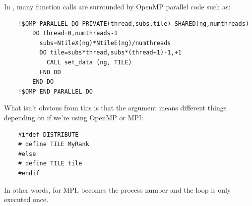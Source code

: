 In , many function calls are surrounded by
OpenMP parallel code such as:
\begin{verbatim}
    !$OMP PARALLEL DO PRIVATE(thread,subs,tile) SHARED(ng,numthreads)
        DO thread=0,numthreads-1
          subs=NtileX(ng)*NtileE(ng)/numthreads
          DO tile=subs*thread,subs*(thread+1)-1,+1
            CALL set_data (ng, TILE)
          END DO
        END DO
    !$OMP END PARALLEL DO 
\end{verbatim}
What isn't obvious from this is that the argument  means
different things depending on if we're using OpenMP or MPI:
\begin{verbatim}
    #ifdef DISTRIBUTE
    # define TILE MyRank
    #else
    # define TILE tile
    #endif
\end{verbatim}
In other words, for MPI,  becomes the process number and
the loop is only executed once.

